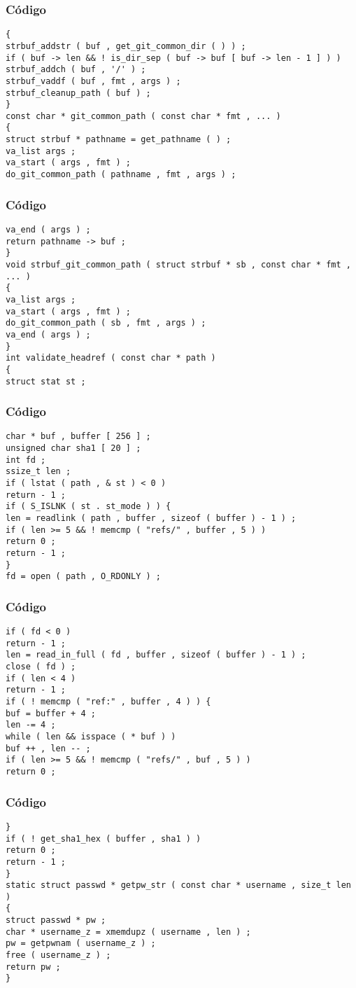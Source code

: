 \documentclass{beamer}
\begin{document}
\begin{frame}[fragile]
\frametitle{C\'odigo}
\begin{verbatim}
{ 
strbuf_addstr ( buf , get_git_common_dir ( ) ) ; 
if ( buf -> len && ! is_dir_sep ( buf -> buf [ buf -> len - 1 ] ) ) 
strbuf_addch ( buf , '/' ) ; 
strbuf_vaddf ( buf , fmt , args ) ; 
strbuf_cleanup_path ( buf ) ; 
} 
const char * git_common_path ( const char * fmt , ... ) 
{ 
struct strbuf * pathname = get_pathname ( ) ; 
va_list args ; 
va_start ( args , fmt ) ; 
do_git_common_path ( pathname , fmt , args ) ; 
\end{verbatim}
\end{frame}
\begin{frame}[fragile]
\frametitle{C\'odigo}
\begin{verbatim}
va_end ( args ) ; 
return pathname -> buf ; 
} 
void strbuf_git_common_path ( struct strbuf * sb , const char * fmt , ... ) 
{ 
va_list args ; 
va_start ( args , fmt ) ; 
do_git_common_path ( sb , fmt , args ) ; 
va_end ( args ) ; 
} 
int validate_headref ( const char * path ) 
{ 
struct stat st ; 
\end{verbatim}
\end{frame}
\begin{frame}[fragile]
\frametitle{C\'odigo}
\begin{verbatim}
char * buf , buffer [ 256 ] ; 
unsigned char sha1 [ 20 ] ; 
int fd ; 
ssize_t len ; 
if ( lstat ( path , & st ) < 0 ) 
return - 1 ; 
if ( S_ISLNK ( st . st_mode ) ) { 
len = readlink ( path , buffer , sizeof ( buffer ) - 1 ) ; 
if ( len >= 5 && ! memcmp ( "refs/" , buffer , 5 ) ) 
return 0 ; 
return - 1 ; 
} 
fd = open ( path , O_RDONLY ) ; 
\end{verbatim}
\end{frame}
\begin{frame}[fragile]
\frametitle{C\'odigo}
\begin{verbatim}
if ( fd < 0 ) 
return - 1 ; 
len = read_in_full ( fd , buffer , sizeof ( buffer ) - 1 ) ; 
close ( fd ) ; 
if ( len < 4 ) 
return - 1 ; 
if ( ! memcmp ( "ref:" , buffer , 4 ) ) { 
buf = buffer + 4 ; 
len -= 4 ; 
while ( len && isspace ( * buf ) ) 
buf ++ , len -- ; 
if ( len >= 5 && ! memcmp ( "refs/" , buf , 5 ) ) 
return 0 ; 
\end{verbatim}
\end{frame}
\begin{frame}[fragile]
\frametitle{C\'odigo}
\begin{verbatim}
} 
if ( ! get_sha1_hex ( buffer , sha1 ) ) 
return 0 ; 
return - 1 ; 
} 
static struct passwd * getpw_str ( const char * username , size_t len ) 
{ 
struct passwd * pw ; 
char * username_z = xmemdupz ( username , len ) ; 
pw = getpwnam ( username_z ) ; 
free ( username_z ) ; 
return pw ; 
} 
\end{verbatim}
\end{frame}
\end{document}

